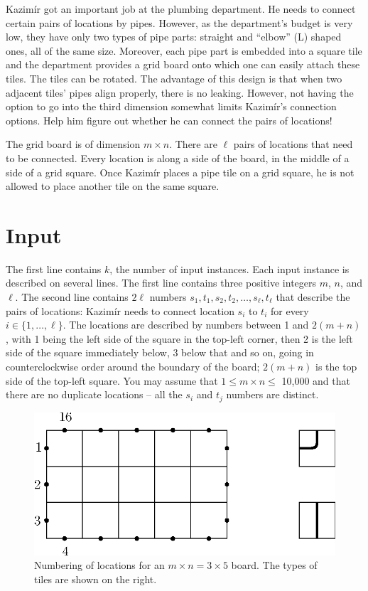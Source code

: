 
Kazim\'ir got an important job at the plumbing department. He needs to connect certain pairs of locations by pipes. However, as the department's budget is very low, they have only two types of pipe parts: straight and ``elbow'' (L) shaped ones, all of the same size. Moreover, each pipe part is embedded into a square tile and the department provides a grid board onto which one can easily attach these tiles. The tiles can be rotated. The advantage of this design is that when two adjacent tiles' pipes align properly, there is no leaking. However, not having the option to go into the third dimension somewhat limits Kazim\'ir's connection options. Help him figure out whether he can connect the pairs of locations!

The grid board is of dimension $m\times n$. There are $\ell$ pairs of locations that need to be connected. Every location is along a side of the board, in the middle of a side of a grid square. Once Kazim\'ir places a pipe tile on a grid square, he is not allowed to place another tile on the same square.

\section*{Input}
The first line contains $k$, the number of input instances.
Each input instance is described on several lines. The first line contains three positive integers $m$, $n$, and $\ell$.
The second line contains $2\ell$ numbers $s_1,t_1,s_2,t_2,\dots,s_{\ell},t_{\ell}$ that describe the pairs of locations: Kazim\'ir needs to connect location $s_i$ to $t_i$ for every $i\in\{1,\dots,\ell\}$. The locations are described by numbers between 1 and $2(m+n)$, with 1 being the left side of the square in the top-left corner, then 2 is the left side of the square immediately below, 3 below that and so on, going in counterclockwise order around the boundary of the board; $2(m+n)$ is the top side of the top-left square. You may assume that $1\leq m\times n\leq$ 10,000 and that there are no duplicate locations -- all the $s_i$ and $t_j$ numbers are distinct.


\begin{figure}[h]
  \begin{center}
    \includegraphics[scale=0.7]{pipe0}
  \end{center}
  \caption{Numbering of locations for an $m\times n = 3\times 5$ board. The types of tiles are shown on the right.}
\end{figure}

